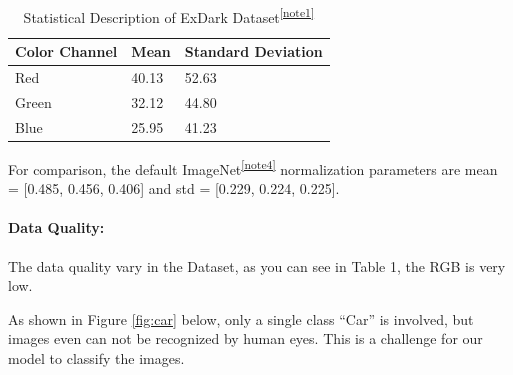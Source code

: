 \documentclass{article} %
\begin{document}
\begin{table}[h]
\centering
\begin{tabular}{|l|l|l|}
\hline
\textbf{Color Channel} & \textbf{Mean} & \textbf{Standard Deviation} \\
\hline
Red & 40.13 & 52.63 \\
Green & 32.12 & 44.80 \\
Blue & 25.95 & 41.23 \\
\hline
\end{tabular}
\caption{Statistical Description of ExDark Dataset\textsuperscript{\ref{note1}}}
\label{table:exdark_stats}
\end{table}
For comparison, the default ImageNet\textsuperscript{\ref{note4}} normalization parameters are mean = [0.485, 0.456, 0.406] and std = [0.229, 0.224, 0.225].


\paragraph{Data Quality:}
The data quality vary in the Dataset, as you can see in Table 1, the RGB is very low. 


As shown in Figure \ref{fig:car} below, only a single class ``Car'' is involved, but images even can not be recognized by human eyes. This is a challenge for our model to classify the images. 
\end{document}
